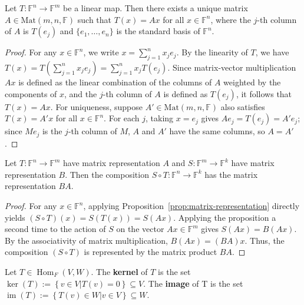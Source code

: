 		\begin{proposition}
			\label{prop:matrix-representation}
			Let $T: \mathbb{F}^n \to \mathbb{F}^m$ be a linear map. Then there exists a unique matrix $A \in \mathrm{Mat}(m, n, \mathbb{F})$ such that $T(x) = Ax$ for all $x \in \mathbb{F}^n$, where the $j$-th column of $A$ is $T(e_j)$ and $\{e_1, \dots, e_n\}$ is the standard basis of $\mathbb{F}^n$.
		\end{proposition}
		
		\begin{proof}
			For any $x \in \mathbb{F}^n$, we write $x = \sum_{j=1}^n x_j e_j$. By the linearity of $T$, we have $T(x) = T(\sum_{j=1}^n x_j e_j) = \sum_{j=1}^n x_j T(e_j)$. Since matrix-vector multiplication $Ax$ is defined as the linear combination of the columns of $A$ weighted by the components of $x$, and the $j$-th column of $A$ is defined as $T(e_j)$, it follows that $T(x) = Ax$. \newline
			\indent For uniqueness, suppose $A'\in\mathrm{Mat}(m,n,\mathbb{F})$ also satisfies $T(x)=A'x$ for all $x\in\mathbb{F}^n$. For each $j$, taking $x=e_j$ gives $Ae_j = T(e_j) = A'e_j$; since $Me_j$ is the $j$-th column of $M$, $A$ and $A'$ have the same columns, so $A=A'$.
		\end{proof}
		
		\begin{corollary}
			\label{cor:composition-multiplication}
			Let $T: \mathbb{F}^n \to \mathbb{F}^m$ have matrix representation $A$ and $S: \mathbb{F}^m \to \mathbb{F}^k$ have matrix representation $B$. Then the composition $S \circ T: \mathbb{F}^n \to \mathbb{F}^k$ has the matrix representation $BA$.
		\end{corollary}
		
		\begin{proof}
			For any $x \in \mathbb{F}^n$, applying Proposition~\ref{prop:matrix-representation} directly yields $(S \circ T)(x) = S(T(x)) = S(Ax)$. Applying the proposition a second time to the action of $S$ on the vector $Ax \in \mathbb{F}^m$ gives $S(Ax) = B(Ax)$. By the associativity of matrix multiplication, $B(Ax) = (BA)x$. Thus, the composition $(S \circ T)$ is represented by the matrix product $BA$.
		\end{proof}
		
		\begin{definition}
			Let $T \in \operatorname{Hom}_{F}(V,W)$. The \textbf{kernel} of $T$ is the set $\ker(T) := \left\{ v \in V | T(v) = 0 \right\} \subseteq V$. The \textbf{image} of T is the set $\operatorname{im}(T) := \left\{ T(v) \in W | v \in V \right\} \subseteq W$.
		\end{definition}
		
